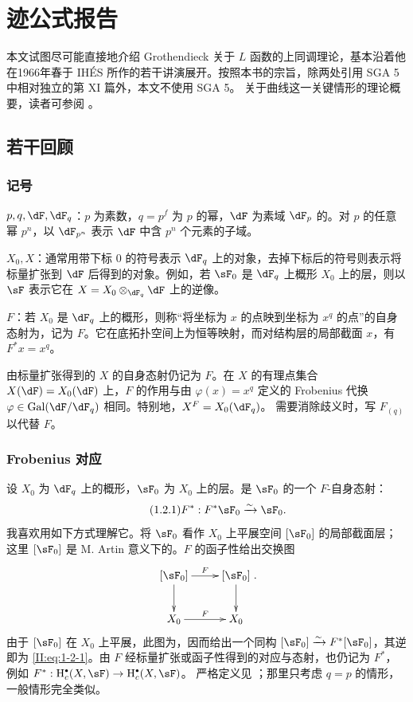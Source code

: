 \chapter{迹公式报告}\label{II}
本文试图尽可能直接地介绍 Grothendieck 关于 $L$ 函数的上同调理论，基本沿着他在1966年春于 IHÉS 所作的若干讲演展开。按照本书的宗旨，除两处引用 SGA 5 中相对独立的第 XI 篇外，本文不使用 SGA 5。
关于曲线这一关键情形的理论概要，读者可参阅 \cite[\S10，第81--90页]{de73}。

\section{若干回顾}\label{II:1}
\subsection{记号}\label{II:1-1}
$p,q,\dF,\dF_q$：$p$ 为素数，$q=p^f$ 为 $p$ 的幂，$\dF$ 为素域 $\dF_p$ 的。对 $p$ 的任意幂 $p^n$，以 $\dF_{p^n}$ 表示 $\dF$ 中含 $p^n$ 个元素的子域。

$X_0,X$：通常用带下标 $0$ 的符号表示 $\dF_q$ 上的对象，去掉下标后的符号则表示将标量扩张到 $\dF$ 后得到的对象。例如，若 $\sF_0$ 是 $\dF_q$ 上概形 $X_0$ 上的层，则以 $\sF$ 表示它在 $X=X_0\otimes_{\dF_q}\dF$ 上的逆像。

$F$：若 $X_0$ 是 $\dF_q$ 上的概形，则称“将坐标为 $x$ 的点映到坐标为 $x^q$ 的点”的自身态射为，记为 $F$。它在底拓扑空间上为恒等映射，而对结构层的局部截面 $x$，有 $F^*x=x^q$。

由标量扩张得到的 $X$ 的自身态射仍记为 $F$。在 $X$ 的有理点集合 $X(\dF)=X_0(\dF)$ 上，$F$ 的作用与由 $\varphi(x)=x^q$ 定义的 Frobenius 代换 $\varphi\in\gal(\dF/\dF_q)$ 相同。特别地，$X^F=X_0(\dF_q)$。
需要消除歧义时，写 $F_{(q)}$ 以代替 $F$。

\subsection{Frobenius 对应}\label{II:1-2}
设 $X_0$ 为 $\dF_q$ 上的概形，$\sF_0$ 为 $X_0$ 上的层。是 $\sF_0$ 的一个 $F$-自身态射：
\begin{equation*}\tag{1.2.1}\label{II:eq:1-2-1}
F^*:F^*\sF_0\iso\sF_0.
\end{equation*}
我喜欢用如下方式理解它。将 $\sF_0$ 看作 $X_0$ 上平展空间 $[\sF_0]$ 的局部截面层；这里 $[\sF_0]$ 是 M. Artin 意义下的。$F$ 的函子性给出交换图
\[\xymatrix{[\sF_0]\ar[r]^-F\ar[d]&[\sF_0]\ar[d]\\X_0\ar[r]^F&X_0}.\]
由于 $[\sF_0]$ 在 $X_0$ 上平展，此图为，因而给出一个同构 $[\sF_0]\iso F^*[\sF_0]$，其逆即为 \eqref{II:eq:1-2-1}。由 $F$ 经标量扩张或函子性得到的对应与态射，也仍记为 $F^*$，例如 $F^*:\h_c^\bullet(X,\sF)\to\h_c^\bullet(X,\sF)$。
严格定义见 \cite[XV, \S1--2]{sga5}；那里只考虑 $q=p$ 的情形，一般情形完全类似。

